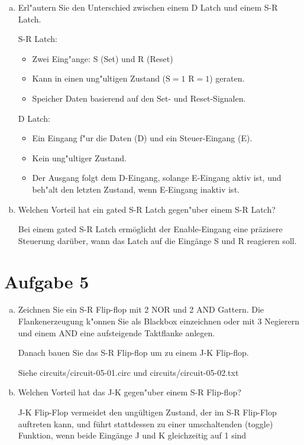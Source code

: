 \documentclass[10pt, oneside]{article}
\begin{document}
\begin{enumerate}[(a)]
    \item Erl"autern Sie den Unterschied zwischen einem D Latch und einem S-R Latch.

        S-R Latch:
        \begin{itemize}[$\rightarrow$]
            \item Zwei Eing"ange: S (Set) und R (Reset)
            \item Kann in einen ung"ultigen Zustand ($\text{S} = 1$ $\text{R} = 1$) geraten.
            \item Speicher Daten basierend auf den Set- und Reset-Signalen.
        \end{itemize}

        D Latch:
        \begin{itemize}[$\rightarrow$]
            \item Ein Eingang f"ur die Daten (D) und ein Steuer-Eingang (E).
            \item Kein ung"ultiger Zustand.
            \item Der Ausgang folgt dem D-Eingang, solange E-Eingang aktiv ist,
                und beh"alt den letzten Zustand, wenn E-Eingang inaktiv ist.
        \end{itemize}

    \item Welchen Vorteil hat ein gated S-R Latch gegen"uber einem S-R Latch?

        Bei einem gated S-R Latch ermöglicht der Enable-Eingang eine präzisere Steuerung darüber, wann
        das Latch auf die Eingänge S und R reagieren soll.
\end{enumerate}

\section{Aufgabe 5}
\begin{enumerate}[(a)]
    \item Zeichnen Sie ein S-R Flip-flop mit 2 NOR und 2 AND Gattern. Die
        Flankenerzeugung k"onnen Sie als Blackbox einzeichnen oder mit 3
        Negierern und einem AND eine aufsteigende Taktflanke anlegen.

        Danach bauen Sie das S-R Flip-flop um zu einem J-K Flip-flop.

        Siehe circuits/circuit-05-01.circ und circuits/circuit-05-02.txt

    \item Welchen Vorteil hat das J-K gegen"uber einem S-R Flip-flop?

        J-K Flip-Flop vermeidet den ungültigen Zustand, der im S-R Flip-Flop
        auftreten kann, und führt stattdessen zu einer umschaltenden (toggle)
        Funktion, wenn beide Eingänge J und K gleichzeitig auf 1 sind
\end{enumerate}
\end{document}
